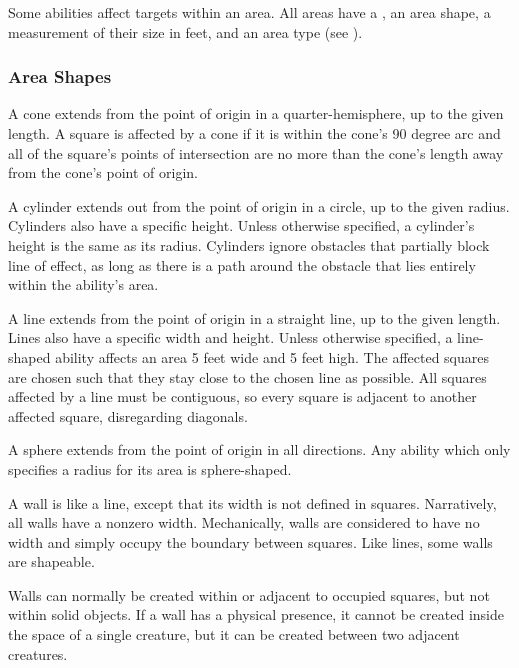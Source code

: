         Some abilities affect targets within an area.
        All areas have a , an area shape, a measurement of their size in feet, and an area type (see ).

        \subsubsection{Area Shapes}\label{Area Shapes}

             A cone extends from the point of origin in a quarter-hemisphere, up to the given length.
            A square is affected by a cone if it is within the cone's 90 degree arc and all of the square's points of intersection are no more than the cone's length away from the cone's point of origin.

             A cylinder extends out from the point of origin in a circle, up to the given radius.
            Cylinders also have a specific height.
            Unless otherwise specified, a cylinder's height is the same as its radius.
            Cylinders ignore obstacles that partially block line of effect, as long as there is a path around the obstacle that lies entirely within the ability's area.

             A line extends from the point of origin in a straight line, up to the given length.
            Lines also have a specific width and height.
            Unless otherwise specified, a line-shaped ability affects an area 5 feet wide and 5 feet high.
            The affected squares are chosen such that they stay close to the chosen line as possible.
            All squares affected by a line must be contiguous, so every square is adjacent to another affected square, disregarding diagonals.

             A sphere extends from the point of origin in all directions.
            Any ability which only specifies a radius for its area is sphere-shaped.

             A wall is like a line, except that its width is not defined in squares.
            Narratively, all walls have a nonzero width.
            Mechanically, walls are considered to have no width and simply occupy the boundary between squares.
            Like lines, some walls are shapeable.

            Walls can normally be created within or adjacent to occupied squares, but not within solid objects.
            If a wall has a physical presence, it cannot be created inside the space of a single creature, but it can be created between two adjacent creatures.

